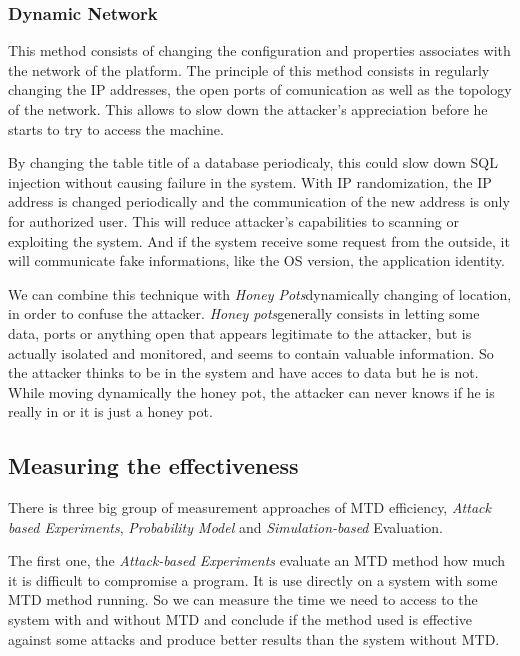 \subsubsection{Dynamic Network}

This method consists of changing the configuration and properties
associates with the network of the platform. The principle of this
method consists in regularly changing the IP addresses, the open ports
of comunication as well as the topology of the network. This allows to
slow down the attacker's appreciation before he starts to try to
access the machine.

By changing the table title of a database periodicaly, this could slow
down SQL injection without causing failure in the system. With IP
randomization, the IP address is changed periodically and
the  communication of  the new address is only  for authorized user. This will
reduce attacker's capabilities to scanning or exploiting the
system. And if the system receive some request from the outside, it
will communicate fake informations, like the OS version, the
application identity.

We can combine this technique with \emph{Honey Pots}dynamically changing
of location, in order to confuse the attacker. \emph{Honey pots}generally
consists in letting some data, ports or anything open that appears
legitimate to the attacker, but is actually isolated and monitored,
and seems to contain valuable information. So the attacker thinks to
be in the system and have acces to data but he is not. While moving dynamically
 the honey pot, the attacker can never knows if he is really in or it is just
 a honey pot.

\subsection{Measuring the effectiveness}


There is three big group of measurement approaches of MTD efficiency,
\emph{Attack based Experiments}, \emph{Probability Model} and \emph{Simulation-based}
Evaluation. 

The first one, the \emph{Attack-based Experiments} evaluate an MTD method
how much it is difficult to compromise a program. It is use directly
on a system with some MTD method running. So we can measure the time
we need to access to the system with and without MTD and conclude if
the method used is effective against some attacks and produce better
results than the system without MTD.

